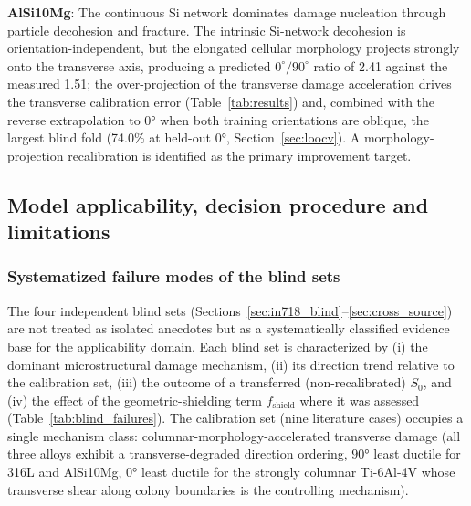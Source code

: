 \documentclass[12pt,a4paper,twocolumn]{article}
\begin{document}
\textbf{AlSi10Mg}: The continuous Si network dominates damage nucleation through particle decohesion and fracture. The intrinsic Si-network decohesion is orientation-independent, but the elongated cellular morphology projects strongly onto the transverse axis, producing a predicted $0^\circ/90^\circ$ ratio of 2.41 against the measured 1.51; the over-projection of the transverse damage acceleration drives the transverse calibration error (Table~\ref{tab:results}) and, combined with the reverse extrapolation to $\ang{0}$ when both training orientations are oblique, the largest blind fold (74.0\% at held-out $\ang{0}$, Section~\ref{sec:loocv}). A morphology-projection recalibration is identified as the primary improvement target.

\subsection{Model applicability, decision procedure and limitations}

\subsubsection{Systematized failure modes of the blind sets}
\label{sec:applicability}

The four independent blind sets (Sections~\ref{sec:in718_blind}--\ref{sec:cross_source}) are not treated as isolated anecdotes but as a systematically classified evidence base for the applicability domain. Each blind set is characterized by (i) the dominant microstructural damage mechanism, (ii) its direction trend relative to the calibration set, (iii) the outcome of a transferred (non-recalibrated) $S_0$, and (iv) the effect of the geometric-shielding term $f_{\text{shield}}$ where it was assessed (Table~\ref{tab:blind_failures}). The calibration set (nine literature cases) occupies a single mechanism class: columnar-morphology-accelerated transverse damage (all three alloys exhibit a transverse-degraded direction ordering, $\ang{90}$ least ductile for 316L and AlSi10Mg, $\ang{0}$ least ductile for the strongly columnar Ti-6Al-4V whose transverse shear along colony boundaries is the controlling mechanism).
\end{document}
